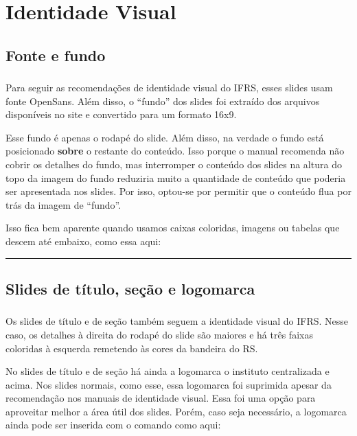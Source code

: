 \documentclass[aspectratio=169]{beamer}
\begin{document}
\section{Identidade Visual}

\subsection{Fonte e fundo}

\begin{frame}[t]\frametitle{\secname}\framesubtitle{\subsecname}
  Para seguir as recomendações de identidade visual do IFRS, esses slides usam fonte OpenSans.
  Além disso, o ``fundo'' dos slides foi extraído dos arquivos disponíveis no site e convertido para um formato 16x9.

  Esse fundo é apenas o rodapé do slide.
  Além disso, na verdade o fundo está posicionado \textbf{sobre} o restante do conteúdo.
  Isso porque o manual recomenda não cobrir os detalhes do fundo, mas
  interromper o conteúdo dos slides na altura do topo da imagem do fundo reduziria muito a quantidade de conteúdo que poderia ser apresentada nos slides.
  Por isso, optou-se por permitir que o conteúdo flua por trás da imagem de ``fundo''.
  
  Isso fica bem aparente quando usamos caixas coloridas, imagens ou tabelas que descem até embaixo, como essa aqui:

  \color{vermelho}\rule{\textwidth}{0.5cm}
\end{frame}

\subsection{Slides de título, seção e logomarca}

\begin{frame}[t]\frametitle{\secname}\framesubtitle{\subsecname}
  Os slides de título e de seção também seguem a identidade visual do IFRS.
  Nesse caso, os detalhes à direita do rodapé do slide são maiores e há três faixas coloridas à esquerda remetendo às cores da bandeira do RS.

  No slides de título e de seção há ainda a logomarca o instituto centralizada e acima.
  Nos slides normais, como esse, essa logomarca foi suprimida apesar da recomendação nos manuais de identidade visual.
  Essa foi uma opção para aproveitar melhor a área útil dos slides.
  Porém, caso seja necessário, a logomarca ainda pode ser inserida com o comando  como aqui:\\
  \vfill\hspace*{-1em}\inserttitlegraphic\vspace*{-2em}
\end{frame}
\end{document}
